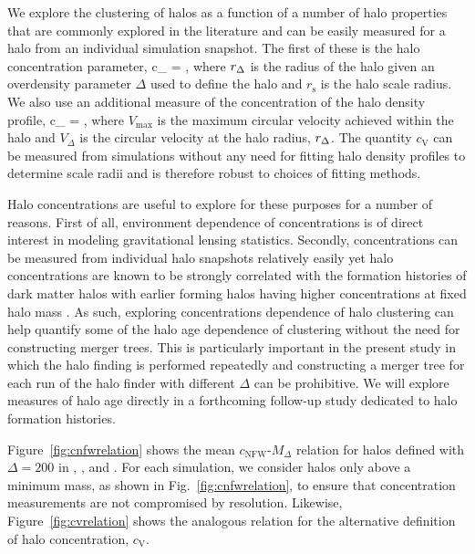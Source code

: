 \documentclass[usenatbib,usegraphicx,letterpaper]{mn2e}
\begin{document}
We explore the clustering of halos as a function of a number of halo properties that are commonly explored in the 
literature and can be easily measured for a halo from an individual simulation snapshot. The first of these is the 
halo concentration parameter, 
\beq
c_{} = ,
\eeq
where $r_{\Delta}$ is the radius of the halo given an overdensity parameter $\Delta$ used to define the halo and 
$r_{\mathrm{s}}$ is the halo scale radius. We also use an additional measure of the concentration of the halo 
density profile, 
\beq
c_{} = , 
\eeq
where $V_{\mathrm{max}}$ is the maximum circular velocity achieved within the halo and $V_{\Delta}$ is the circular 
velocity at the halo radius, $r_{\Delta}$. The quantity $c_{\mathrm{V}}$ can be measured from simulations without 
any need for fitting halo density profiles to determine scale radii and is therefore robust to choices of fitting methods. 


Halo concentrations are useful to explore for these purposes for a number of reasons. First of all, environment dependence 
of concentrations is of direct interest in modeling gravitational lensing statistics. Secondly, concentrations can be measured 
from individual halo snapshots relatively easily yet halo concentrations are known to be strongly correlated with the formation 
histories of dark matter halos with earlier forming halos having higher concentrations at fixed halo mass 
. As such, exploring concentrations dependence of halo clustering can 
help quantify some of the halo age dependence of clustering without the need for constructing merger trees. This 
is particularly important in the present study in which the halo finding is performed repeatedly and constructing a 
merger tree for each run of the halo finder with different $\Delta$ can be prohibitive. We will explore measures of 
halo age directly in a forthcoming follow-up study dedicated to halo formation histories.


Figure~\ref{fig:cnfwrelation} shows the mean $c_{\mathrm{NFW}}$-$M_{\Delta}$ relation for halos defined with $\Delta=200$ 
in \simA, \simB, and \simC. For each simulation, we consider halos only above a minimum mass, as shown in Fig.~\ref{fig:cnfwrelation}, to ensure that concentration measurements are not compromised by resolution. Likewise, Figure~\ref{fig:cvrelation} shows the analogous 
relation for the alternative definition of halo concentration, $c_{\mathrm{V}}$. 
\end{document}
